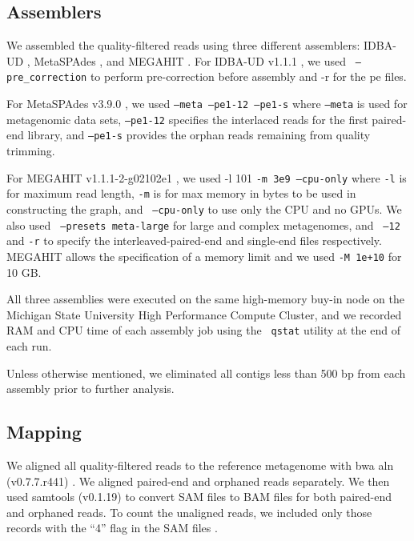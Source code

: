 \documentclass[11pt]{article}
\begin{document}
\subsection*{Assemblers}

We assembled the quality-filtered reads using three different
assemblers: IDBA-UD \cite{idba}, MetaSPAdes \cite{metaspades}, and MEGAHIT
\cite{megahit}.  For IDBA-UD v1.1.1 \cite{idba}, we used {\tt
  {--pre\_correction}} to perform pre-correction before assembly and
-r for the pe files.

For MetaSPAdes v3.9.0 \cite{metaspades}, we used { \tt {--meta --pe1-12
    --pe1-s}} where {\tt{--meta}} is used for
metagenomic data sets, {\tt{--pe1-12}} specifies the interlaced reads
for the first paired-end library, and {\tt{--pe1-s}} provides the
orphan reads remaining from quality trimming.

For MEGAHIT v1.1.1-2-g02102e1 \cite{megahit}, we used -l 101 {\tt{-m 3e9
    --cpu-only}} where {\tt -l} is for maximum read length, {\tt -m} is
for max memory in bytes to be used in constructing the graph, and {\tt
  {--cpu-only}} to use only the CPU and no GPUs. We also used {\tt
  {--presets meta-large}} for large and complex metagenomes, and {\tt
  {--12} } and {\tt{-r}} to specify the
interleaved-paired-end and single-end files respectively.  MEGAHIT allows
the specification of a memory limit and we used {\tt -M 1e+10} for 10 GB.

All three assemblies were executed on the same high-memory buy-in node
on the Michigan State University High Performance Compute Cluster, and
we recorded RAM and CPU time of each assembly job using the {\tt
  qstat} utility at the end of each run.

Unless otherwise mentioned, we eliminated all contigs less than 500 bp
from each assembly prior to further analysis.

\subsection*{Mapping}

We aligned all quality-filtered reads to the reference metagenome with
bwa aln (v0.7.7.r441) \cite{bwa}. We aligned paired-end and orphaned
reads separately. We then used samtools (v0.1.19)
\cite{sam-stools} to convert SAM files to BAM files for both
paired-end and orphaned reads. To count the unaligned reads, we
included only those records with the ``4'' flag in the SAM files
\cite{sam-stools}.
 

\end{document}
